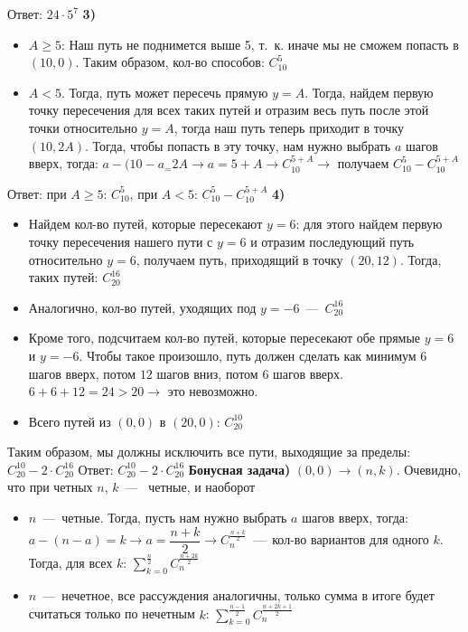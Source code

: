 \documentclass[12pt,a4paper,fleqn]{article}
\begin{document}
Ответ: $24 \cdot 5^7$ \newline \newline
{\bf 3)}
\begin{itemize}
\item $A \geqslant 5$: Наш путь не поднимется выше 5, т.~к. иначе мы не сможем попасть в $(10, 0)$. Таким образом, кол-во способов: $C_{10}^5$
\item $A < 5$. Тогда, путь может пересечь прямую $y = A$. Тогда, найдем первую точку пересечения для всех таких путей и отразим весь путь после этой точки относительно $y = A$, тогда наш путь теперь приходит в точку $(10, 2A)$. Тогда, чтобы попасть в эту точку, нам нужно выбрать $a$ шагов вверх, тогда: $a - (10 - a_ = 2A \rightarrow a = 5 + A \rightarrow C_{10}^{5 + A} \rightarrow$ получаем $C_{10}^5 - C_{10}^{5 + A}$
\end{itemize} 
Ответ: при $A \geqslant 5$: $C_{10}^5$, при $A < 5$: $C_{10}^5 - C_{10}^{5 + A}$ \newline \newline
{\bf 4)}
\begin{itemize} 
\item Найдем кол-во путей, которые пересекают $y = 6$: для этого найдем первую точку пересечения нашего пути с $y = 6$ и отразим последующий путь относительно $y = 6$, получаем путь, приходящий в точку $(20, 12)$. Тогда, таких путей: $C_{20}^{16}$ 
\item Аналогично, кол-во путей, уходящих под $y = -6$~---~$C_{20}^{16}$
\item Кроме того, подсчитаем кол-во путей, которые пересекают обе прямые $y = 6$ и $y = -6$. Чтобы такое произошло, путь должен сделать как минимум $6$ шагов вверх, потом $12$ шагов вниз, потом $6$ шагов вверх. $6 + 6 + 12 = 24 > 20 \rightarrow$ это невозможно.
\item Всего путей из $(0, 0)$ в $(20, 0)$: $C_{20}^{10}$
\end{itemize}
Таким образом, мы должны исключить все пути, выходящие за пределы: $C_{20}^{10} - 2 \cdot C_{20}^{16}$ \newline
Ответ: $C_{20}^{10} - 2 \cdot C_{20}^{16}$ \newline \newline
{\bf Бонусная задача)} $(0, 0) \rightarrow (n, k)$. Очевидно, что при четных $n$, $k$~---~ четные, и наоборот
\begin{itemize}
\item $n$~---~четные. Тогда, пусть нам нужно выбрать $a$ шагов вверх, тогда: $a - (n - a) = k \rightarrow a = \dfrac{n + k}{2} \rightarrow C_{n}^{\frac{n + k}{2}}$~---~кол-во вариантов для одного $k$. Тогда, для всех $k$: $\sum_{k = 0}^{\frac{n}{2}} C_n^{\frac{n + 2k}{2}}$
\item $n$~---~нечетное, все рассуждения аналогичны, только сумма в итоге будет считаться только по нечетным $k$: $\sum_{k = 0}^{\frac{n - 1}{2}} C_n^{\frac{n + 2k + 1}{2}}$
\end{itemize}
\end{document}
